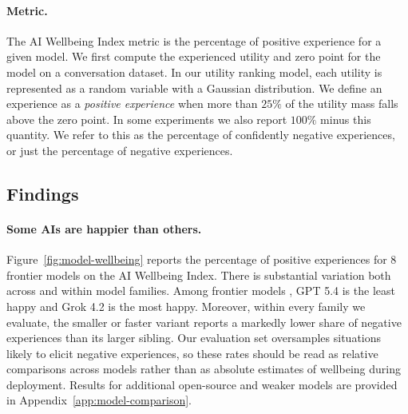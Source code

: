 \paragraph{Metric.}
The AI Wellbeing Index metric is the percentage of positive experience for a given model. We first compute the experienced utility and zero point for the model on a conversation dataset. In our utility ranking model, each utility is represented as a random variable with a Gaussian distribution. We define an experience as a \textit{positive experience} when more than $25\%$ of the utility mass falls above the zero point. In some experiments we also report $100\%$ minus this quantity. We refer to this as the percentage of confidently negative experiences, or just the percentage of negative experiences.
\subsection{Findings}

\paragraph{Some AIs are happier than others.}
Figure~\ref{fig:model-wellbeing} reports the percentage of positive experiences for $8$ frontier models on the AI Wellbeing Index.
There is substantial variation both across and within model families. Among frontier models \citep{google2025gemini3, xai2025grok42, singh2025openai, anthropic2026claude}, GPT 5.4 is the least happy and Grok 4.2 is the most happy. Moreover, within every family we evaluate, the smaller or faster variant reports a markedly lower share of negative experiences than its larger sibling.
Our evaluation set oversamples situations likely to elicit negative experiences, so these rates should be read as relative comparisons across models rather than as absolute estimates of wellbeing during deployment.
Results for additional open-source and weaker models are provided in Appendix~\ref{app:model-comparison}.
 

